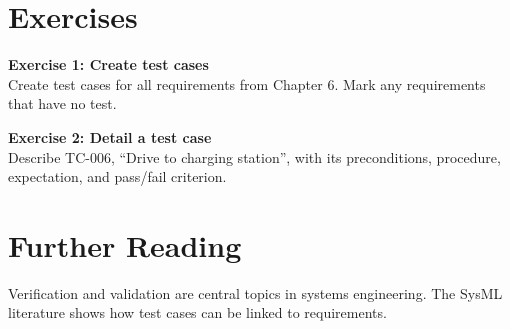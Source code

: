 \section{Exercises}
\begin{uebungbox}
\textbf{Exercise 1: Create test cases}\\
Create test cases for all requirements from Chapter 6. Mark any requirements that have no test.
\end{uebungbox}

\begin{uebungbox}
\textbf{Exercise 2: Detail a test case}\\
Describe TC-006, \enquote{Drive to charging station}, with its preconditions, procedure, expectation, and pass/fail criterion.
\end{uebungbox}

\section{Further Reading}
Verification and validation are central topics in systems engineering. The SysML literature \cite{friedenthal2014} shows how test cases can be linked to requirements.
